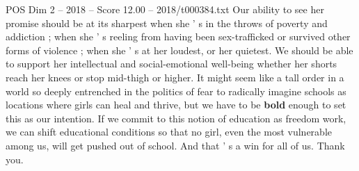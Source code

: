 \begin{textsample}{POS Dim 2 – 2018 – Score 12.00 – 2018/t000384.txt}
Our ability to see her promise should be at its sharpest when she ' s in the throws of poverty and addiction ; when she ' s reeling from having been sex-trafficked or survived other forms of violence ; when she ' s at her loudest, or her quietest.
We should be able to support her intellectual and social-emotional well-being whether her shorts reach her knees or stop mid-thigh or higher.
It might seem like a tall order in a world so deeply entrenched in the politics of fear to radically imagine schools as locations where girls can heal and thrive, but we have to be \textbf{bold} enough to set this as our intention.
If we commit to this notion of education as freedom work, we can shift educational conditions so that no girl, even the most vulnerable among us, will get pushed out of school.
And that ' s a win for all of us.
Thank you.

\end{textsample}

